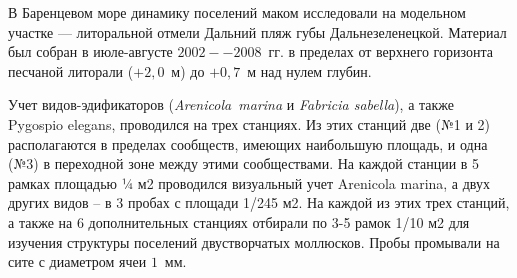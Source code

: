 \documentclass[12pt, a4paper]{disser}
\begin{document}
 






В Баренцевом море динамику поселений маком исследовали на модельном участке --- литоральной отмели Дальний пляж губы Дальнезеленецкой. 
 Материал был собран в июле-августе $2002 -- 2008$~гг. в пределах от верхнего горизонта песчаной литорали ($+2,0$~м) до $+0,7$~м над нулем глубин. 

Учет видов-эдификаторов ({\it Arenicola marina} и {\it Fabricia sabella}), а также Pygospio elegans, проводился на трех станциях. Из этих станций две (№1 и 2) располагаются в пределах сообществ, имеющих наибольшую площадь, и одна (№3) в переходной зоне между этими сообществами.  На каждой станции в 5 рамках площадью ¼ м2 проводился визуальный учет Arenicola marina, а двух других видов – в 3 пробах с площади 1/245 м2. 
На каждой из этих трех станций, а также на 6 дополнительных станциях отбирали по 3-5 рамок 1/10 м2 для изучения структуры поселений двустворчатых моллюсков. Пробы промывали на сите с диаметром ячеи $1$~мм. 
\end{document}
